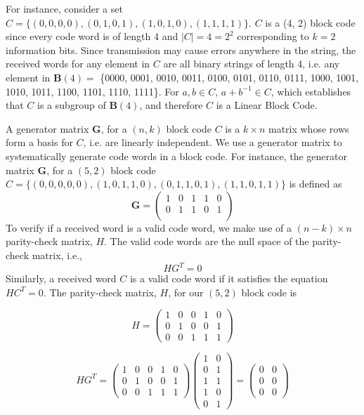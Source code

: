 \documentclass{article}
\begin{document}
For instance, consider a set \(C = \{(0,0,0,0), (0,1,0,1), (1,0,1,0), (1,1,1,1)\}\). \(C\) is a (4, 2) block 
code since every code word is of length 4 and \(|C| = 4 = 2^2\) corresponding to \(k=2\) information bits. 
Since transmission may cause errors anywhere in the string, the received words for any element in \(C\) 
are all binary strings of length 4, i.e. any element in \(\mathbf{B}(4) =\) \{0000, 0001, 0010, 0011, 0100, 
0101, 0110, 0111, 1000, 1001, 1010, 1011, 1100, 1101, 1110, 1111\}. For \(a, b \in C\), \(a + b^{-1} \in C\),
which establishes that \(C\) is a subgroup of \(\mathbf{B}(4)\), and therefore \(C\) is a Linear Block Code.


A generator matrix \(\mathbf{G}\), for a \((n, k)\) block code \(C\) is a \(k \times n\) matrix whose rows form 
a basis for \(C\), i.e. are linearly independent. We use a generator matrix \parencite{berlekamp1972survey} to 
systematically generate code words in a block code. For instance, the generator matrix \(\mathbf{G}\), for a 
\((5, 2)\) block code \(C = \{(0,0,0,0,0), (1,0,1,1,0), (0,1,1,0,1), (1,1,0,1,1)\}\) is defined as
\[\mathbf{G} = \begin{pmatrix} 
    1 & 0 & 1 & 1 & 0 \\
    0 & 1 & 1 & 0 & 1 \\
\end{pmatrix}\]
To verify if a received word is a valid code word, we make use of a \((n-k) \times n\) parity-check matrix,
\(H\). The valid code words are the null space of the parity-check matrix, i.e., \[HG^T = 0\]
Similarly, a received word \(C\) is a valid code word if it satisfies the equation \( HC^T = 0 \).
The parity-check matrix, \(H\), for our \((5, 2)\) block code is

\[
H = \begin{pmatrix}
1 & 0 & 0 & 1 & 0 \\
0 & 1 & 0 & 0 & 1 \\
0 & 0 & 1 & 1 & 1
\end{pmatrix}\]

\[
HG^T = \begin{pmatrix}
1 & 0 & 0 & 1 & 0 \\
0 & 1 & 0 & 0 & 1 \\
0 & 0 & 1 & 1 & 1
\end{pmatrix}
\begin{pmatrix}
1 & 0 \\
0 & 1 \\
1 & 1 \\
1 & 0 \\
0 & 1
\end{pmatrix}
= 
\begin{pmatrix}
0 & 0 \\
0 & 0 \\
0 & 0
\end{pmatrix}
\]
\end{document}
